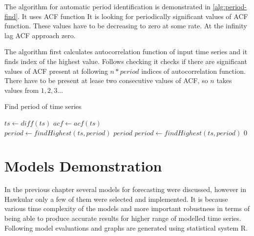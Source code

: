     The algorithm for automatic period identification is demonstrated in \ref{alg:period-find}. It uses ACF function
    It is looking for periodically significant values of ACF function. These values have to be decreasing to zero at
    some rate. At the infinity lag ACF approach zero.

    The algorithm first calculates autocorrelation function of input time series and it finds index of the highest
    value. Follows checking it checks if there are significant values of ACF present at following $n*period$
    indices of autocorrelation function. There have to be present at lease two consecutive values of ACF, so $n$ takes
    values from $1,2,3\dots$

    \begin{algorithm}
        \caption{Find period of time series} \label{alg:period-find}
        \begin{algorithmic}[1]
             
                \State $ts \gets diff(ts)$ 
            \EndIf
            \State $acf \gets acf(ts)$ \\
            \State $period \gets findHighest(ts, period)$
                    \State \Return $period$
                \EndIf
                $period \gets findHighest(ts, period)$
            \EndWhile
            \State \Return $0$
        \EndFunction
        \end{algorithmic}
    \end{algorithm}


\chapter{Models Demonstration}
In the previous chapter several models for forecasting were discussed, however in Hawkular only a few of them were
selected and implemented. It is because various time complexity of the models and more important robustness in terms of
being able to produce accurate results for higher range of modelled time series.
Following model evaluations and graphs are generated using statistical system R.

